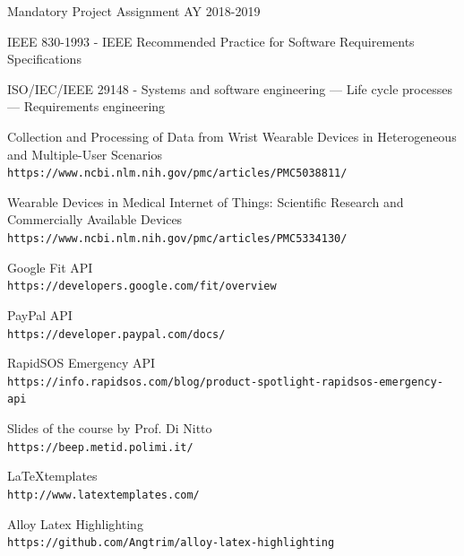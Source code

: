 \documentclass[12pt]{article}
\begin{document}
\clearpage
\begin{thebibliography}{9}
   Mandatory Project Assignment AY 2018-2019

   IEEE 830-1993 - IEEE Recommended Practice for Software Requirements Specifications

   ISO/IEC/IEEE 29148 - Systems and software engineering — Life cycle processes — Requirements engineering

   Collection and Processing of Data from Wrist Wearable Devices in Heterogeneous and Multiple-User Scenarios\\
  \texttt{https://www.ncbi.nlm.nih.gov/pmc/articles/PMC5038811/}

   Wearable Devices in Medical Internet of Things: Scientific Research and Commercially Available Devices\\
  \texttt{https://www.ncbi.nlm.nih.gov/pmc/articles/PMC5334130/}

   Google Fit API\\
  \texttt{https://developers.google.com/fit/overview}

   PayPal API\\
  \texttt{https://developer.paypal.com/docs/}

   RapidSOS Emergency API\\
  \texttt{https://info.rapidsos.com/blog/product-spotlight-rapidsos-emergency-api}

  Slides of the course by Prof. Di Nitto\\
  \texttt{https://beep.metid.polimi.it/}

  \LaTeX templates\\
  \texttt{http://www.latextemplates.com/}

  Alloy Latex Highlighting\\
  \texttt{https://github.com/Angtrim/alloy-latex-highlighting}


\end{thebibliography}
\end{document}
